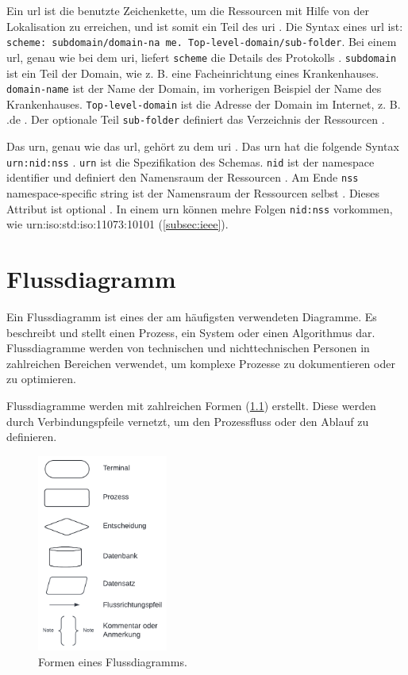  Ein \acf{url} ist die benutzte Zeichenkette, um die Ressourcen mit Hilfe von der Lokalisation zu erreichen, und ist somit ein Teil des \ac{uri} \cite{uribibdiff2}. Die Syntax eines \ac{url} ist: \texttt{scheme: subdomain/domain-na me. Top-level-domain/sub-folder}. Bei einem \ac{url}, genau wie bei dem \ac{uri}, liefert \texttt{scheme} die Details des Protokolls \cite{uribibdiff}. \texttt{subdomain} ist ein Teil der Domain, wie z. B. eine Facheinrichtung eines Krankenhauses. \texttt{domain-name} ist der Name der Domain, im vorherigen Beispiel der Name des Krankenhauses. \texttt{Top-level-domain} ist die Adresse der Domain im Internet, z. B. \glqq .de\grqq{} \cite{uribibdiff}. Der optionale Teil \texttt{sub-folder} definiert das Verzeichnis der Ressourcen \cite{uribibdiff, uribibdiff2}.
 
 Das \acf{urn}, genau wie das \ac{url}, gehört zu dem \ac{uri} \cite{uribibdiff}. Das \ac{urn} hat die folgende Syntax \texttt{urn:nid:nss} \cite{uribibdiff, uribibdiff2}. \texttt{urn} ist die Spezifikation des Schemas. \texttt{nid} ist der \glqq namespace identifier\grqq{} und definiert den Namensraum der Ressourcen \cite{uribibdiff}. Am Ende \texttt{nss} \glqq namespace-specific string\grqq{} ist der Namensraum der Ressourcen selbst \cite{uribibdiff}. Dieses Attribut ist optional \cite{uribibdiff2}. In einem \ac{urn} können mehre Folgen \texttt{nid:nss} vorkommen, wie urn:iso:std:iso:11073:10101 (\ref{subsec:ieee}).

 
 \chapter{Flussdiagramm} \label{sec:flowdiagram}
 
 Ein Flussdiagramm ist eines der am häufigsten verwendeten Diagramme. Es beschreibt und stellt einen Prozess, ein System oder einen Algorithmus dar. Flussdiagramme werden von technischen und nichttechnischen Personen in zahlreichen Bereichen verwendet, um komplexe Prozesse zu dokumentieren oder zu optimieren.
 
 Flussdiagramme werden mit zahlreichen Formen (\ref{fig:flowdiagramappen}) erstellt. Diese werden durch Verbindungspfeile vernetzt, um den Prozessfluss oder den Ablauf zu definieren.
 
 \begin{figure}[ht]
 	\centering
 	\includegraphics[height=6.5cm]{figures/flowdiagram}
 	\caption[Formen eines Flussdiagramms]{Formen eines Flussdiagramms.}
 	\label{fig:flowdiagramappen}
 \end{figure}
